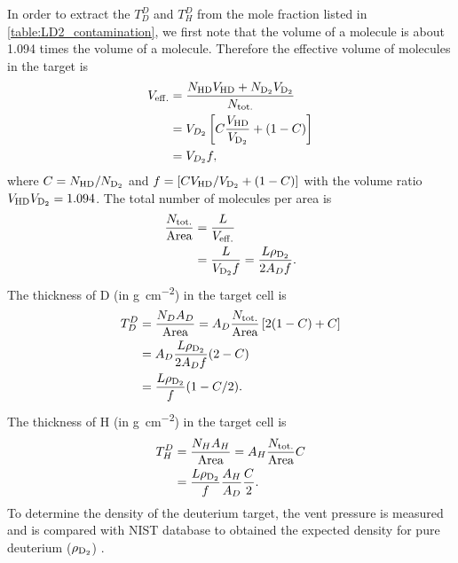 \documentclass[../main.tex]{subfiles}
\begin{document}
In order to extract the $T_D^D$ and $T^D_H$ from the mole fraction listed in \cref{table:LD2_contamination},
we first note that the volume of a  molecule is about \num{1.094} times the volume of a 
molecule. Therefore the effective volume of molecules in the target is
\begin{equation}
	\begin{split}
		V_{\mathrm{eff.}}&=\frac{N_{\ce{HD}} V_{\ce{HD}} + N_{\ce{D_2}} V_{\ce{D_2}}}{N_{\text{tot.}}}\\
		&=V_{D_2} \left[ C \frac{V_{\ce{HD}}}{V_{\ce{D_2}}} + (1-C) \right]\\
		&=V_{D_2} f,
	\end{split}
\end{equation}
where $C=N_{\ce{HD}}/N_{\ce{D_2}}$ and $f=\left[ C V_{\ce{HD}}/V_{\ce{D_2}} + (1-C) \right]$ with the
volume ratio $V_{\ce{HD}}V_{\ce{D_2}}=1.094$.
The total number of molecules per area is
\begin{equation}
	\begin{split}
		\frac{N_{\mathrm{tot.}}}{\mathrm{Area}} &= \frac{L}{V_{\mathrm{eff.}}}\\
		&= \frac{L}{V_{\ce{D_2}}f}=\frac{L\rho_{\ce{D_2}}}{2A_Df}.
	\end{split}
\end{equation}
The thickness of D (in \unit{\g\per\cm\squared}) in the target cell is
\begin{equation}
	\begin{split}
		T_D^D &= \frac{N_D A_D}{\mathrm{Area}} = A_D\frac{N_{\mathrm{tot.}}}{\mathrm{Area}} \left[ 2(1-C) + C \right]\\
		&=A_D \frac{L\rho_{\ce{D_2}}}{2A_Df}(2-C)\\
		&=\frac{L\rho_{\ce{D_2}}}{f}(1-C/2).
	\end{split}
\end{equation}
The thickness of H (in \unit{\g\per\cm\squared}) in the target cell is
\begin{equation}
	\begin{split}
		T^D_H &= \frac{N_H A_H}{\mathrm{Area}} = A_H\frac{N_{\mathrm{tot.}}}{\mathrm{Area}}C\\
		&=\frac{L\rho_{\ce{D_2}}}{f}\frac{A_H}{A_D}\frac{C}{2}.
	\end{split}
	\label{eq:TDH}
\end{equation}
To determine the density of the deuterium target, the vent pressure is measured and is compared
with NIST database to obtained the expected density for pure deuterium ($\rho_{\ce{D_2}}$) \cite{density-1453}.
\end{document}
